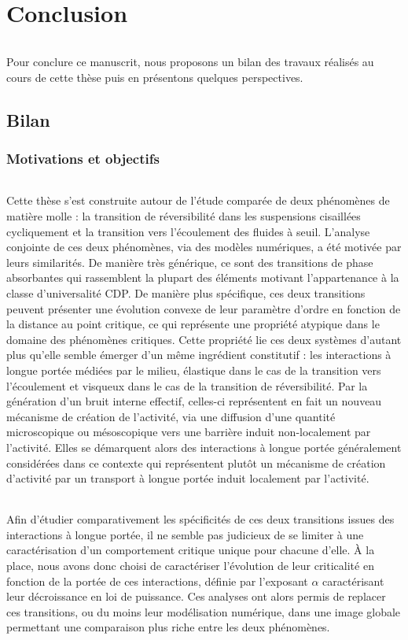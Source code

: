 \chapter*{Conclusion}
\label{chapter:conclusion}

\subparagraph{}Pour conclure ce manuscrit, nous proposons un bilan des travaux réalisés au cours de cette thèse puis en présentons quelques perspectives.

\section*{Bilan}

\subsection*{Motivations et objectifs}

\subparagraph{}Cette thèse s'est construite autour de l'étude comparée de deux phénomènes de matière molle : la transition de réversibilité dans les suspensions cisaillées cycliquement et la transition vers l'écoulement des fluides à seuil. L'analyse conjointe de ces deux phénomènes, via des modèles numériques, a été motivée par leurs similarités. De manière très générique, ce sont des transitions de phase absorbantes qui rassemblent la plupart des éléments motivant l'appartenance à la classe d'universalité CDP. De manière plus spécifique, ces deux transitions peuvent présenter une évolution convexe de leur paramètre d'ordre en fonction de la distance au point critique, ce qui représente une propriété atypique dans le domaine des phénomènes critiques. Cette propriété lie ces deux systèmes d'autant plus qu'elle semble émerger d'un même ingrédient constitutif : les interactions à longue portée médiées par le milieu, élastique dans le cas de la transition vers l'écoulement et visqueux dans le cas de la transition de réversibilité. Par la génération d'un bruit interne effectif, celles-ci représentent en fait un nouveau mécanisme de création de l'activité, via une diffusion d'une quantité microscopique ou mésoscopique vers une barrière induit non-localement par l'activité. Elles se démarquent alors des interactions à longue portée généralement considérées dans ce contexte qui représentent plutôt un mécanisme de création d'activité par un transport à longue portée induit localement par l'activité.

\subparagraph{}Afin d'étudier comparativement les spécificités de ces deux transitions issues des interactions à longue portée, il ne semble pas judicieux de se limiter à une caractérisation d'un comportement critique unique pour chacune d'elle. \`A la place, nous avons donc choisi de caractériser l'évolution de leur criticalité en fonction de la portée de ces interactions, définie par l'exposant $\alpha$ caractérisant leur décroissance en loi de puissance. Ces analyses ont alors permis de replacer ces transitions, ou du moins leur modélisation numérique, dans une image globale permettant une comparaison plus riche entre les deux phénomènes.

